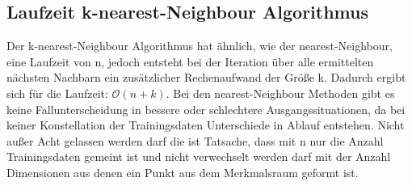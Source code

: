 \documentclass[a4paper]{scrartcl}
\begin{document}
\begin{multicols}{2}
                        \subsection{Laufzeit k-nearest-Neighbour Algorithmus}
                        Der k-nearest-Neighbour Algorithmus hat ähnlich, wie der nearest-Neighbour, eine Laufzeit von n, jedoch entsteht bei der Iteration über alle ermittelten nächsten Nachbarn ein zusätzlicher Rechenaufwand der Größe k. Dadurch ergibt sich für die Laufzeit:
                        $\mathcal{O}(n+k)$.
                        Bei den nearest-Neighbour Methoden gibt es keine Fallunterscheidung in bessere oder schlechtere Ausgangssituationen, da bei keiner Konstellation der Trainingsdaten Unterschiede in Ablauf entstehen.
                        Nicht außer Acht gelassen werden darf die ist Tatsache, dass mit n nur die Anzahl Trainingsdaten gemeint ist und nicht verwechselt werden darf mit der Anzahl Dimensionen aus denen ein Punkt aus dem Merkmalsraum geformt ist.


    \end{multicols}

    
    
\end{document}
